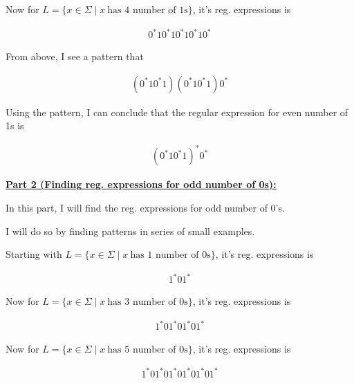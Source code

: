 \documentclass[12pt]{article}
\begin{document}
\begin{enumerate}[a.]
    Now for $L = \{x \in \Sigma \mid x\:\text{has 4 number of 1s}\}$,
    it's reg. expressions is

    \begin{align}
        0^*10^*10^*10^*10^*
    \end{align}

    \bigskip

    From above, I see a pattern that

    \begin{align}
        (0^*10^*1)(0^*10^*1)0^*
    \end{align}

    \bigskip

    Using the pattern, I can conclude that the regular expression for
    even number of 1s is

    \begin{align}
        (0^*10^*1)^*0^*
    \end{align}


    \underline{\textbf{Part 2 (Finding reg. expressions for odd number of 0s):}}

    \bigskip

    In this part, I will find the reg. expressions for odd number of 0's.

    \bigskip

    I will do so by finding patterns in series of small examples.

    \bigskip

    Starting with $L = \{x \in \Sigma \mid x\:\text{has 1 number of 0s}\}$,
    it's reg. expressions is

    \begin{align}
        1^*01^*
    \end{align}

    \bigskip

    Now for  $L = \{x \in \Sigma \mid x\:\text{has 3 number of 0s}\}$,
    it's reg. expressions is

    \bigskip

    \begin{align}
        1^*01^*01^*01^*
    \end{align}

    \bigskip

    Now for $L = \{x \in \Sigma \mid x\:\text{has 5 number of 0s}\}$,
    it's reg. expressions is

    \bigskip

    \begin{align}
        1^*01^*01^*01^*01^*01^*
    \end{align}


\end{enumerate}
\end{document}
